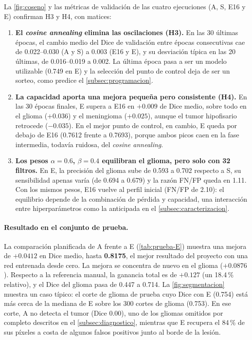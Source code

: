 La \cref{fig:coseno} y las métricas de validación de las cuatro ejecuciones (A, S, E16 y E) confirman H3 y H4, con matices:

\begin{enumerate}
  \item \textbf{El \textit{cosine annealing} elimina las oscilaciones (H3).} En las 30 últimas épocas, el cambio medio del Dice de validación entre épocas consecutivas cae de 0.022--0.030 (A y S) a 0.003 (E16 y E), y su desviación típica en las 20 últimas, de 0.016--0.019 a 0.002. La última época pasa a ser un modelo utilizable (0.749 en E) y la selección del punto de control deja de ser un sorteo, como predice el \cref{subsec:programacion}.
  \item \textbf{La capacidad aporta una mejora pequeña pero consistente (H4).} En las 30 épocas finales, E supera a E16 en $+0.009$ de Dice medio, sobre todo en el glioma ($+0.036$) y el meningioma ($+0.025$), aunque el tumor hipofisario retrocede ($-0.035$). En el mejor punto de control, en cambio, E queda por debajo de E16 (0.7612 frente a 0.7693), porque ambos picos caen en la fase intermedia, todavía ruidosa, del \textit{cosine annealing}.
  \item \textbf{Los pesos $\alpha=0.6$, $\beta=0.4$ equilibran el glioma, pero solo con 32 filtros.} En E, la precisión del glioma sube de 0.593 a 0.702 respecto a S, su sensibilidad apenas varía (de 0.694 a 0.679) y la razón FN/FP queda en 1.11. Con los mismos pesos, E16 vuelve al perfil inicial (FN/FP de 2.10): el equilibrio depende de la combinación de pérdida y capacidad, una interacción entre hiperparámetros como la anticipada en el \cref{subsec:caracterizacion}.
\end{enumerate}

\paragraph{Resultado en el conjunto de prueba.} La comparación planificada de A frente a E (\cref{tab:prueba-E}) muestra una mejora de $+0.0412$ en Dice medio, hasta \textbf{0.8175}, el mejor resultado del proyecto con una red entrenada desde cero. La mejora se concentra de nuevo en el glioma ($+0.0876$). Respecto a la referencia manual, la ganancia total es de $+0.127$ (un 18.4\,\% relativo), y el Dice del glioma pasa de 0.447 a 0.714. La \cref{fig:segmentacion} muestra un caso típico: el corte de glioma de prueba cuyo Dice con E (0.754) está más cerca de la mediana de E sobre los 300 cortes de glioma (0.753). En ese corte, A no detecta el tumor (Dice 0.00), uno de los gliomas omitidos por completo descritos en el \cref{subsec:diagnostico}, mientras que E recupera el 84\,\% de sus píxeles a costa de algunos falsos positivos junto al borde de la lesión.

